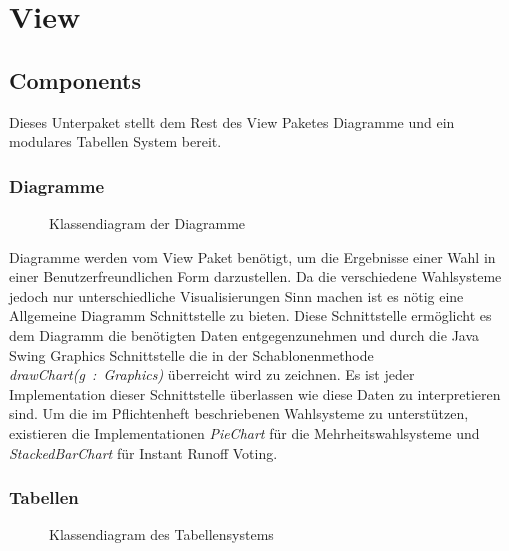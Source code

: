 \documentclass[parskip=full]{scrartcl}
\newcommand{\textitx}[1]{\mbox{\textit{#1}}}
\begin{document}
	\section{View}
	\pagestyle{plain}	
		\subsection{Components}
		Dieses Unterpaket stellt dem Rest des View Paketes Diagramme und ein modulares Tabellen System bereit.
		
		\subsubsection{Diagramme}
		\begin{figure}[!h]
			\centering
			
			\caption{Klassendiagram der Diagramme}
		\end{figure}
		
		Diagramme werden vom View Paket benötigt, um die Ergebnisse einer Wahl in einer Benutzerfreundlichen Form darzustellen. Da die verschiedene Wahlsysteme jedoch nur unterschiedliche Visualisierungen Sinn machen ist es nötig eine Allgemeine Diagramm Schnittstelle zu bieten. Diese Schnittstelle ermöglicht es dem Diagramm die benötigten Daten entgegenzunehmen und durch die Java Swing Graphics Schnittstelle die in der Schablonenmethode \textitx{drawChart(g : Graphics)} überreicht wird zu zeichnen. Es ist jeder Implementation dieser Schnittstelle überlassen wie diese Daten zu interpretieren sind. Um die im Pflichtenheft beschriebenen Wahlsysteme zu unterstützen, existieren die Implementationen \textitx{PieChart} für die Mehrheitswahlsysteme und \textitx{StackedBarChart} für Instant Runoff Voting.
		
		\subsubsection{Tabellen}
		\begin{figure}[!h]
		\centering
		
		\caption{Klassendiagram des Tabellensystems}
		\end{figure}
		
\end{document}
